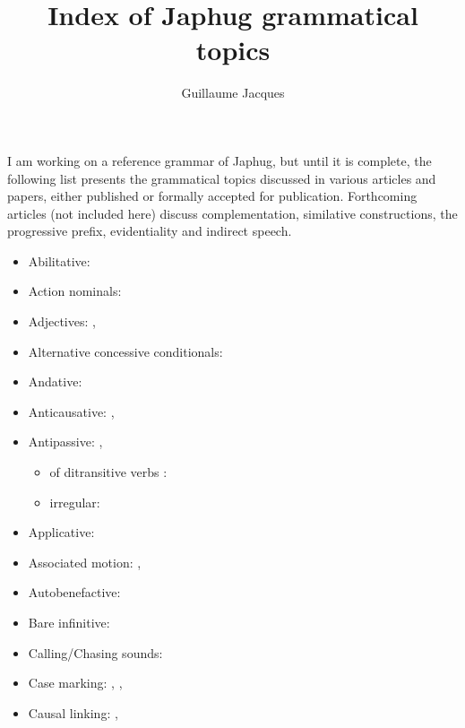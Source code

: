 \documentclass[oldfontcommands,oneside,a4paper,11pt]{article}
\begin{document}
 
\title{Index of Japhug grammatical topics}
\author{Guillaume Jacques}
\maketitle

I am working on a reference grammar of Japhug, but until it is complete, the following list presents the grammatical topics discussed in various articles and papers, either published or formally accepted for publication. Forthcoming articles (not included here) discuss complementation, similative constructions, the progressive prefix, evidentiality and indirect speech.

\begin{itemize}
\item Abilitative: \citet{jacques15causative}
\item Action nominals: \citet[7]{jacques14antipassive}
\item Adjectives: \citet[275]{jacques16complementation}, \citet[627]{jacques17sketch}
\item Alternative concessive conditionals: \citet[298]{jacques14linking}
\item Andative: \citet[200-6]{jacques13harmonization}
\item Anticausative: \citet[213-4]{jacques12demotion}, \citet{jacques15spontaneous}
\item Antipassive: \citet[215-6]{jacques12demotion}, \citet{jacques14antipassive}
\begin{itemize}
\item of ditransitive verbs : \citet[13-4]{jacques14antipassive}
\item irregular:  \citet[18-20]{jacques14antipassive}
\end{itemize}
\item Applicative: \citet{jacques13tropative}
\item Associated motion: \citet[200-6]{jacques13harmonization}, \citet[623]{jacques17sketch}
\item Autobenefactive: \citet{jacques15spontaneous}
\item Bare infinitive: \citet[9]{jacques14antipassive}
\item Calling/Chasing sounds:   \citet[283-4]{japhug14ideophones}
\item Case marking: \citet{jacques17sketch}, \citet{jacques16comparative}, \citet[260-261]{jacques16complementation}
\item Causal linking:  \citet[303-6]{jacques14linking}, \citet{jacques16comparative}

\end{itemize}
\end{document}

